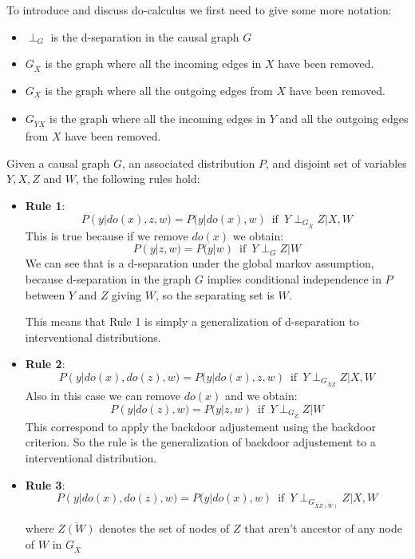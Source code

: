 To introduce and discuss do-calculus we first need to give some more notation:
\begin{itemize}
    \item $\perp_G$ is the d-separation in the causal graph $G$
    \item $G_{\overline{X}}$ is the graph where all the incoming edges in $X$ have been removed.
    \item $G_{\underline{X}}$ is the graph where all the outgoing edges from $X$ have been removed.
    \item $G_{\overline{Y}\underline{X}}$ is the graph where all the incoming edges in $Y$ and all the outgoing edges from $X$ have been removed.
\end{itemize}
\begin{definition}
    Given a causal graph $G$, an associated distribution $P$, and disjoint set of variables $Y, X, Z$ and $W$, the following rules hold:
    \begin{itemize}
        \item \textbf{Rule 1}:
              \begin{equation}
                  P(y | do(x), z, w) = P(y | do(x), w) \, \text{ if } \, Y \perp_{G_{\overline{X}}} Z | X, W
              \end{equation}
              This is true because if we remove $do(x)$ we obtain:
              $$P(y |z, w) = P(y | w) \, \text{ if } \, Y \perp_{G} Z | W$$
              We can see that is a d-separation under the global markov assumption,
              because d-separation in the graph $G$ implies conditional independence
              in $P$ between $Y$ and $Z$ giving $W$, so the separating set is $W$.

              This means that Rule 1 is simply a generalization of d-separation to
              interventional distributions.
        \item \textbf{Rule 2}:
              \begin{equation}
                  P(y | do(x), do(z), w) = P(y | do(x), z, w) \, \text{ if } \, Y \perp_{G_{\overline{X}\underline{Z}}} Z | X, W
              \end{equation}
              Also in this case we can remove $do(x)$ and we obtain:
              $$P(y | do(z), w) = P(y |  z, w) \, \text{ if } \, Y \perp_{G_{\underline{Z}}} Z | W$$
              This correspond to apply the backdoor adjustement using the backdoor
              criterion. So the rule is the generalization of backdoor adjustement to
              a interventional distribution.
        \item \textbf{Rule 3}:
              \begin{equation}
                  P(y | do(x), do(z), w) = P(y | do(x), w) \, \text{ if } \, Y \perp_{G_{\overline{X}\overline{Z(W)}}} Z | X, W
              \end{equation}

              where $\overline{Z(W)}$ denotes the set of nodes of $Z$ that aren't ancestor of any node of $W$ in $G_{\overline{X}}$
    \end{itemize}
\end{definition}
